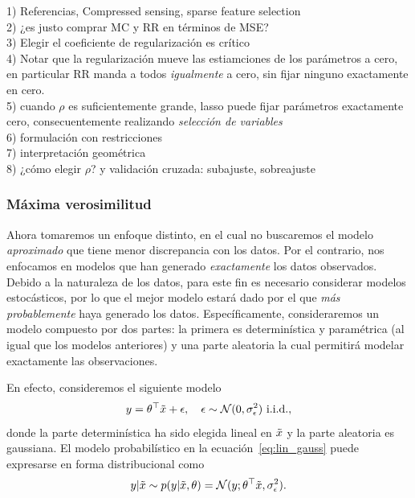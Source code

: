 \begin{mdframed}[style=pendiente, frametitle={\center Regularización versus mínimos cuadrados}]
1) Referencias, Compressed sensing, sparse feature selection\\
2) ¿es justo comprar MC y RR en términos de MSE?\\
3) Elegir el coeficiente de regularización es crítico\\
4) Notar que la regularización mueve las estiamciones de los parámetros a cero, en particular RR manda a todos \emph{igualmente} a cero, sin fijar ninguno exactamente en cero. \\
5) cuando $\rho$ es suficientemente grande, lasso puede fijar parámetros exactamente cero, consecuentemente realizando \emph{selección de variables}\\
6) formulación con restricciones\\
7) interpretación geométrica\\
8) ¿cómo elegir $\rho$? y validación cruzada: subajuste, sobreajuste
\end{mdframed}

\subsubsection{Máxima verosimilitud} %
\label{ssub:max_ver}

Ahora tomaremos un enfoque distinto, en el cual no buscaremos el modelo \emph{aproximado} que tiene menor discrepancia con los datos. Por el contrario, nos enfocamos en modelos que han generado \emph{exactamente} los datos observados. Debido a la naturaleza de los datos, para este fin es necesario considerar modelos estocásticos, por lo que el mejor modelo estará dado por el que \emph{más probablemente} haya generado los datos. Específicamente, consideraremos un modelo compuesto por dos partes: la primera es determinística y paramétrica (al igual que los modelos anteriores) y una parte aleatoria la cual permitirá modelar exactamente las observaciones. 

En efecto, consideremos el siguiente modelo
\begin{equation}
	y = \theta^\top\tilde{x} + \epsilon,\quad \epsilon\sim{\mathcal N}(0,\sigma_\epsilon^2) \ \text{i.i.d.},
	\label{eq:lin_gauss}
\end{equation}
donde la parte determinística ha sido elegida lineal en $\tilde{x}$ y la parte aleatoria es gaussiana. El modelo probabilístico en la ecuación~\eqref{eq:lin_gauss} puede expresarse en forma distribucional como 
\begin{equation}
	y|\tilde{x} \sim p(y|\tilde{x},\theta) = {\mathcal N}(y;\theta^\top\tilde{x},\sigma_\epsilon^2).
\end{equation}

